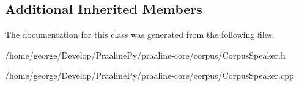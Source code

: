 \subsection*{Additional Inherited Members}


The documentation for this class was generated from the following files\+:\begin{DoxyCompactItemize}
\item 
/home/george/\+Develop/\+Praaline\+Py/praaline-\/core/corpus/Corpus\+Speaker.\+h\item 
/home/george/\+Develop/\+Praaline\+Py/praaline-\/core/corpus/Corpus\+Speaker.\+cpp\end{DoxyCompactItemize}

